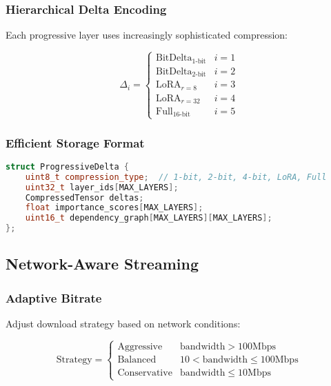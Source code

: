 \subsubsection{Hierarchical Delta Encoding}

Each progressive layer uses increasingly sophisticated compression:

\begin{equation}
\Delta_i = \begin{cases}
\text{BitDelta}_{1\text{-bit}} & i = 1 \\
\text{BitDelta}_{2\text{-bit}} & i = 2 \\
\text{LoRA}_{r=8} & i = 3 \\
\text{LoRA}_{r=32} & i = 4 \\
\text{Full}_{16\text{-bit}} & i = 5
\end{cases}
\end{equation}

\subsubsection{Efficient Storage Format}

\begin{lstlisting}[language=C++, basicstyle=\small\ttfamily]
struct ProgressiveDelta {
    uint8_t compression_type;  // 1-bit, 2-bit, 4-bit, LoRA, Full
    uint32_t layer_ids[MAX_LAYERS];
    CompressedTensor deltas;
    float importance_scores[MAX_LAYERS];
    uint16_t dependency_graph[MAX_LAYERS][MAX_LAYERS];
};
\end{lstlisting}

\subsection{Network-Aware Streaming}

\subsubsection{Adaptive Bitrate}

Adjust download strategy based on network conditions:

\begin{equation}
\text{Strategy} = \begin{cases}
\text{Aggressive} & \text{bandwidth} > 100\text{Mbps} \\
\text{Balanced} & 10 < \text{bandwidth} \leq 100\text{Mbps} \\
\text{Conservative} & \text{bandwidth} \leq 10\text{Mbps}
\end{cases}
\end{equation}

